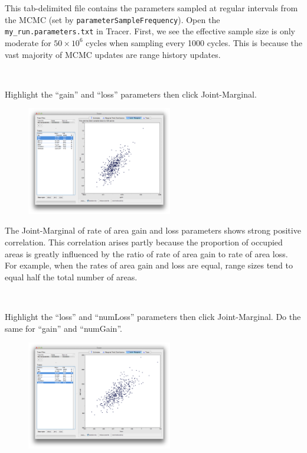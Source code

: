 \documentclass[11pt]{article}
\newcommand{\impmark}{\strut\vadjust{\domark}}
\newcommand{\domark}{%
  \vbox to 0pt{
    \kern-\dp\strutbox
    \smash{\llap{$\rightarrow$\kern1em}}
    \vss
  }%
}
\begin{document}
This tab-delimited file contains the parameters sampled at regular intervals from the MCMC (set by \texttt{parameterSampleFrequency}).
Open the \texttt{my\_run.parameters.txt} in Tracer.
First, we see the effective sample size is only moderate for $50 \times 10^6$ cycles when sampling every 1000 cycles.
This is because the vast majority of MCMC updates are range history updates.

\noindent \\ \impmark  Highlight the ``gain'' and ``loss'' parameters then click Joint-Marginal.

\begin{figure}[H]
\centering
\includegraphics[width=2.5in]{figures/loss_gain}
\end{figure}

The Joint-Marginal of rate of area gain and loss parameters shows strong positive correlation.
This correlation arises partly because the proportion of occupied areas is greatly influenced by the ratio of rate of area gain to rate of area loss.
For example, when the rates of area gain and loss are equal, range sizes tend to equal half the total number of areas.

\noindent \\ \impmark Highlight the ``loss'' and ``numLoss'' parameters then click Joint-Marginal. Do the same for ``gain'' and ``numGain''. \\

\begin{figure}[H]
\centering
\includegraphics[width=2.5in]{figures/loss_numloss}
\end{figure}
\end{document}
